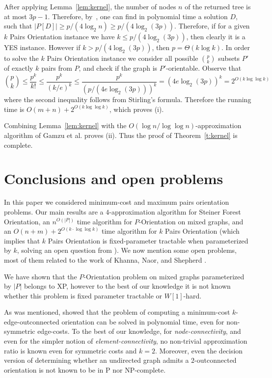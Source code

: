 \documentclass[envcountsame]{llncs}
\begin{document}
After applying Lemma~\ref{lem:kernel}, the number of nodes $n$
of the returned tree is at most $3p-1$.
Therefore, by~\cite{ZV}, one can find in polynomial time
a solution $D$, such that $|P[D]| \ge p/(4\log_2n) \ge p/(4\log_2(3p))$.
Therefore, if for a given {\sf $k$ Pairs Orientation} instance
we have $k \le p/(4\log_2(3p))$, then clearly it is a YES instance.
However if $k>p/(4\log_2(3p))$, then $p=\Theta(k\log k)$. 
In order to solve the {\sf $k$ Pairs Orientation} instance
we consider all possible ${p \choose k}$ subsets $P'$ of exactly $k$
pairs from $P$, and check if the graph is $P'$-orientable.
Observe that
$${p \choose k}\le \frac{p^k}{k!} \le \frac{p^k}{(k/e)^k} \le \frac{p^k}{(p/(4e\log_2 (3p)))^k} = (4e\log_2 (3p))^k = 2^{O(k\log\log k)}$$
where the second inequality follows from Stirling's formula.
Therefore the running time is $O(m+n)+2^{O(k\log\log k)}$, which proves (i).

Combining Lemma~\ref{lem:kernel} with the $O(\log n/\log \log n)$-approximation algorithm of 
Gamzu et al. \cite{segev-approx} proves (ii).
Thus the proof of Theorem~\ref{t:kernel} is complete.

\section{Conclusions and open problems}

In this paper we considered minimum-cost and maximum pairs orientation problems.
Our main results are a $4$-approximation algorithm for {\sf Steiner Forest Orientation},
an $n^{O(|P|)}$ time algorithm for {\sf $P$-Orientation} on mixed graphs,
and an $O(n+m)+2^{O(k\cdot \log \log k)}$ time algorithm for {\sf $k$ Pairs Orientation} 
(which implies that {\sf $k$ Pairs Orientation} is fixed-parameter tractable when parameterized by $k$,
solving an open question from \cite{fpt}).
We now mention some open problems, most of them related to the work of Khanna, Naor, and Shepherd \cite{KNS}.

We have shown that the {\sf $P$-Orientation} problem on mixed graphs parameterized by $|P|$ belongs to XP,
however to the best of our knowledge it is not known whether this problem is fixed parameter tractable
or $W[1]$-hard.

As was mentioned, \cite{KNS} 
showed that the problem of computing a minimum-cost 
$k$-edge-outconnected orientation can be solved in polynomial time, even for non-symmetric edge-costs.
To the best of our knowledge, for {\em node-connectivity}, and even for the simpler notion 
of {\em element-connectivity}, no non-trivial approximation ratio is known even for 
symmetric costs and $k=2$.
Moreover, even the decision version of determining whether 
an undirected graph admits a $2$-outconnected orientation is not known to be in P nor NP-complete.  
\end{document}
